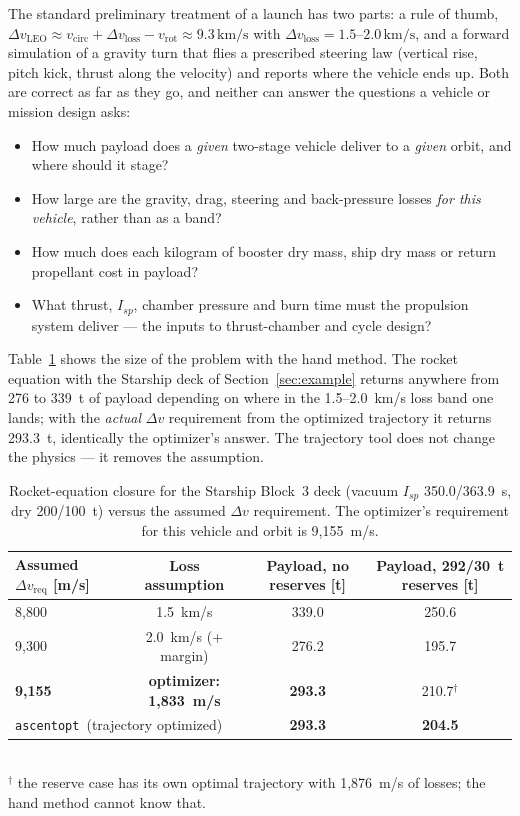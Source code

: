 \documentclass[11pt,a4paper]{article}
\newcommand{\tool}{\texttt{ascentopt}}
\newcommand{\dv}{\Delta v}
\newcommand{\unit}[1]{\,\mathrm{#1}}
\begin{document}
The standard preliminary treatment of a launch has two parts: a rule of thumb, $\dv_{\mathrm{LEO}} \approx v_{\mathrm{circ}}
+ \dv_{\mathrm{loss}} - v_{\mathrm{rot}} \approx 9.3\unit{km/s}$ with $\dv_{\mathrm{loss}} = 1.5$--$2.0\unit{km/s}$,
and a forward simulation of a gravity turn that flies a prescribed steering law (vertical rise, pitch kick, thrust
along the velocity) and reports where the vehicle ends up. Both are correct as far as they go, and neither can answer
the questions a vehicle or mission design asks:
\begin{itemize}
  \item How much payload does a \emph{given} two-stage vehicle deliver to a \emph{given} orbit, and where should it stage?
  \item How large are the gravity, drag, steering and back-pressure losses \emph{for this vehicle}, rather than as a band?
  \item How much does each kilogram of booster dry mass, ship dry mass or return propellant cost in payload?
  \item What thrust, $I_{sp}$, chamber pressure and burn time must the propulsion system deliver --- the inputs to
        thrust-chamber and cycle design?
\end{itemize}
Table~\ref{tab:tsiolkovsky} shows the size of the problem with the hand method. The rocket equation with the
Starship deck of Section~\ref{sec:example} returns anywhere from 276 to 339~t of payload depending on where in the
1.5--2.0~km/s loss band one lands; with the \emph{actual} $\dv$ requirement from the optimized trajectory it
returns 293.3~t, identically the optimizer's answer. The trajectory tool does not change the physics --- it
removes the assumption.

\begin{table}[h]\centering\footnotesize
\caption{Rocket-equation closure for the Starship Block~3 deck (vacuum $I_{sp}$ 350.0/363.9~s, dry 200/100~t)
versus the assumed $\dv$ requirement. The optimizer's requirement for this vehicle and orbit is 9,155~m/s.}
\label{tab:tsiolkovsky}
\begin{tabular}{lccc}
\toprule
Assumed $\dv_{\mathrm{req}}$ [m/s] & Loss assumption & Payload, no reserves [t] & Payload, 292/30~t reserves [t] \\
\midrule
8,800 & 1.5~km/s & 339.0 & 250.6 \\
9,300 & 2.0~km/s (+ margin) & 276.2 & 195.7 \\
\textbf{9,155} & \textbf{optimizer: 1,833~m/s} & \textbf{293.3} & 210.7$^{\dagger}$ \\
\midrule
\multicolumn{2}{l}{\tool\ (trajectory optimized)} & \textbf{293.3} & \textbf{204.5} \\
\bottomrule
\end{tabular}\\[2pt]
{\footnotesize $^{\dagger}$ the reserve case has its own optimal trajectory with 1,876~m/s of losses; the hand method cannot know that.}
\end{table}
\end{document}
